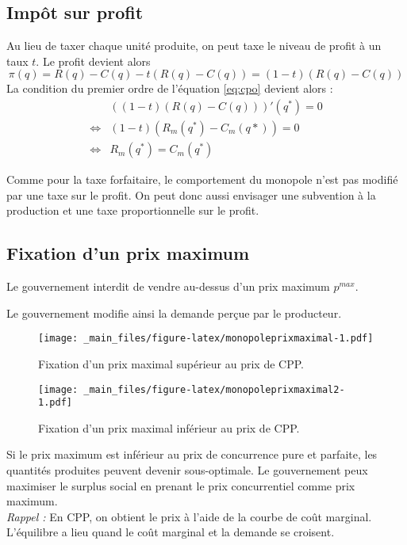 \documentclass[
  a4paper,
]{book}
\theoremstyle{definition}
\theoremstyle{definition}
\theoremstyle{definition}
\theoremstyle{definition}
\theoremstyle{remark}
\begin{document}
\hypertarget{impuxf4t-sur-profit}{%
\subsection{Impôt sur profit}\label{impuxf4t-sur-profit}}

Au lieu de taxer chaque unité produite, on peut taxe le niveau de profit à un taux \(t\).
Le profit devient alors
\[
\pi(q) = R(q) - C(q) -t( R(q) - C(q)) = (1-t)(R(q) - C(q))
\]
La condition du premier ordre de l'équation \eqref{eq:cpo} devient alors :
\[
\begin{array}{rl}
&((1-t)(R(q)-C(q)))'(q^*) = 0\\
\Leftrightarrow & (1-t)(R_m(q^*)-C_m(q*)) = 0\\
\Leftrightarrow & R_m(q^*) = C_m(q^*)
\end{array}
\]

Comme pour la taxe forfaitaire, le comportement du monopole n'est pas modifié par une taxe sur le profit.
On peut donc aussi envisager une subvention à la production et une taxe proportionnelle sur le profit.

\hypertarget{fixation-dun-prix-maximum}{%
\subsection{Fixation d'un prix maximum}\label{fixation-dun-prix-maximum}}

Le gouvernement interdit de vendre au-dessus d'un prix maximum \(p^{max}\).

Le gouvernement modifie ainsi la demande perçue par le producteur.

\begin{figure}
\centering
\texttt{[image: \_main\_files/figure-latex/monopoleprixmaximal-1.pdf]}
\caption{\label{fig:monopoleprixmaximal}Fixation d'un prix maximal supérieur au prix de CPP.}
\end{figure}

\begin{figure}
\centering
\texttt{[image: \_main\_files/figure-latex/monopoleprixmaximal2-1.pdf]}
\caption{\label{fig:monopoleprixmaximal2}Fixation d'un prix maximal inférieur au prix de CPP.}
\end{figure}

Si le prix maximum est inférieur au prix de concurrence pure et parfaite, les quantités produites peuvent devenir sous-optimale.
Le gouvernement peux maximiser le surplus social en prenant le prix concurrentiel comme prix maximum.\\
\emph{Rappel :} En CPP, on obtient le prix à l'aide de la courbe de coût marginal.
L'équilibre a lieu quand le coût marginal et la demande se croisent.
\end{document}
